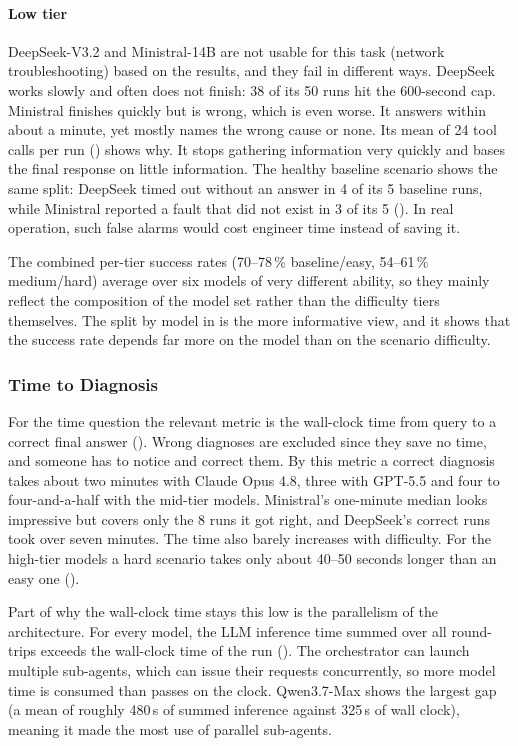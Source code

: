 \paragraph{Low tier} DeepSeek-V3.2 and Ministral-14B are not usable for this task (network troubleshooting) based on the results, and they
fail in different ways. DeepSeek works slowly and often does not finish: 38 of its 50 runs hit the
600-second cap. Ministral finishes quickly but is wrong, which is even worse. It answers within about a minute, yet
mostly names the wrong cause or none. Its mean of 24 tool calls per run
() shows why. It stops gathering information very quickly and bases the final response on little information.
The healthy baseline scenario shows the same split:
DeepSeek timed out without an answer in 4 of its 5 baseline runs, while Ministral reported a
fault that did not exist in 3 of its 5 (). In real operation, such
false alarms would cost engineer time instead of saving it.

The combined per-tier success rates (70--78\,\% baseline/easy, 54--61\,\% medium/hard)
average over six models of very different ability, so they mainly reflect the composition of
the model set rather than the difficulty tiers themselves. The
split by model in  is the more informative view, and it shows that the
success rate depends far more on the model than on the scenario difficulty.

\subsubsection{Time to Diagnosis}
\label{sec:discussion-time}

For the time question the relevant metric is the wall-clock time from query to a correct
final answer (). Wrong diagnoses are excluded since they save no time,
and someone has to notice and correct them. By this metric a correct
diagnosis takes about two minutes with Claude Opus 4.8, three with GPT-5.5 and four to
four-and-a-half with the mid-tier models. Ministral's one-minute median looks impressive but
covers only the 8 runs it got right, and DeepSeek's correct runs took over seven minutes. The
time also barely increases with difficulty. For the high-tier models a hard scenario takes only
about 40--50 seconds longer than an easy one ().

Part of why the wall-clock time stays this low is the parallelism of the architecture. For
every model, the LLM inference time summed over all round-trips exceeds the wall-clock time of
the run (). The orchestrator can launch multiple sub-agents, which can issue their requests
concurrently, so more model time is consumed than passes on the clock. Qwen3.7-Max shows the
largest gap (a mean of roughly 480\,s of summed inference against 325\,s of wall clock), meaning it
made the most use of parallel sub-agents.

